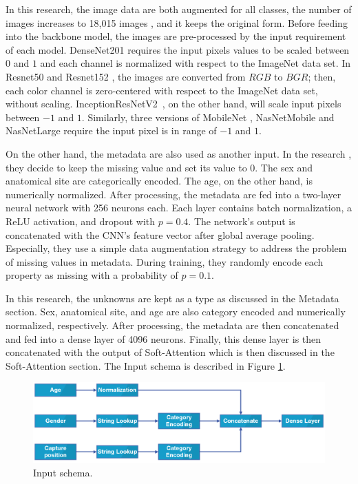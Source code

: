 \documentclass[sensors,article,accept,pdftex,moreauthors]{Definitions/mdpi}
\begin{document}
	In this research, the image data are both augmented for all classes, the number of images increases to 18,015 images , and it keeps the original form. Before feeding into the backbone model, the images are pre-processed by the input requirement of each model. DenseNet201 \cite{06993} requires the input pixels values to be scaled between $0$ and $1$ and each channel is normalized with respect to the ImageNet data set. In Resnet50 and Resnet152 \cite{03385,05027}, the images are converted from $RGB$ to $BGR$; then, each color channel is zero-centered with respect to the ImageNet data set, without scaling. InceptionResNetV2~\cite{11946}, on the other hand, will scale input pixels between $-1$ and $1$. Similarly, three versions of MobileNet \cite{04861,04381,02244}, NasNetMobile and NasNetLarge \cite{07012} require the input pixel is in range of $-1$ and $1$. 
	
	On the other hand, the metadata are also used as another input. In the research \cite{03910}, they decide to keep the missing value and set its value to $0$. The sex and anatomical site are categorically encoded. The age, on the other hand, is numerically normalized. After processing, the metadata are fed into a two-layer neural network with 256 neurons each. Each layer contains batch normalization, a ReLU \cite{08375} activation, and dropout with $p = 0.4$. The network’s output is concatenated with the CNN’s feature vector after global average pooling. Especially, they use a simple data augmentation strategy to address the problem of missing values in metadata. During training, they randomly encode each property as missing with a probability of $p = 0.1$. 
	
	In this research, the unknowns are kept as a type as discussed in the Metadata section. Sex, anatomical site, and age are also category encoded and numerically normalized, respectively. After processing, the metadata are then concatenated and fed into a dense layer of 4096 neurons. Finally, this dense layer is then concatenated with the output of Soft-Attention which is then discussed in the Soft-Attention section. The Input schema is described in {Figure} %
 \ref{fig:input-schema}.
	
	\begin{figure}[H]
		\includegraphics[width=1\linewidth]{"Definitions/Input Schema"}
		\caption{Input schema.}
		\label{fig:input-schema}
	\end{figure}
	
\end{document}
